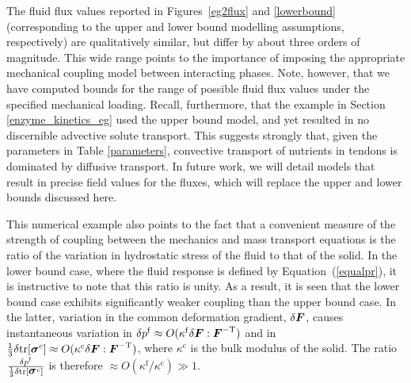 The fluid flux values reported in Figures~\ref{eg2flux} and
\ref{lowerbound} (corresponding to the upper and lower bound modelling
assumptions, respectively) are qualitatively similar, but differ by
about three orders of magnitude. This wide range points to the
importance of imposing the appropriate mechanical coupling model
between interacting phases. Note, however, that we have computed
bounds for the 
range of possible fluid flux values under the specified mechanical
loading. Recall, furthermore, that the example in Section
\ref{enzyme_kinetics_eg} used the upper bound model, and yet resulted
in no discernible advective solute transport. This suggests strongly
that, given the parameters in Table \ref{parameters}, convective
transport of nutrients in tendons is dominated by diffusive
transport. In future work, we will detail models that result in precise
field values for the fluxes, which will replace the upper and lower
bounds discussed here.  


This numerical example also points to the fact that a convenient
measure of the strength of 
coupling between the mechanics and mass transport equations is the
ratio of the variation in hydrostatic stress of the fluid to that of
the solid. In the lower bound case, where the fluid response is
defined by Equation~(\ref{equalpr}), it is instructive to note that
this ratio is unity. As a result, it is seen that the lower bound case
exhibits significantly weaker coupling than the upper bound case. In
the latter, variation in the common deformation gradient, $\delta
\mbox{\boldmath$ F$}$, causes instantaneous variation in \mbox{$\delta p^{\mathrm{f}} \approx
  O(\kappa^{\mathrm{f}} \delta \mbox{\boldmath$ F$}:\mbox{\boldmath$ F$}^{-\mathrm{T}})$} and in
\mbox{$\frac{1}{3} \delta\mathrm{\small{tr}}[\mbox{\boldmath$\sigma$}^{c}] \approx
  O(\kappa^{\mathrm{c}} \delta \mbox{\boldmath$ F$}:\mbox{\boldmath$ F$}^{-\mathrm{T}})$}, where
$\kappa^{\mathrm{c}}$ is the bulk modulus of the solid. The ratio
$\frac{\delta p^{\mathrm{f}}}{\frac{1}{3} \delta
  \mathrm{\small{tr}}[\mbox{\boldmath$\sigma$}^{c}]}$ is therefore \mbox{$\approx
O(\kappa^{\mathrm{f}}/\kappa^{\mathrm{c}}) \gg 1$}.

